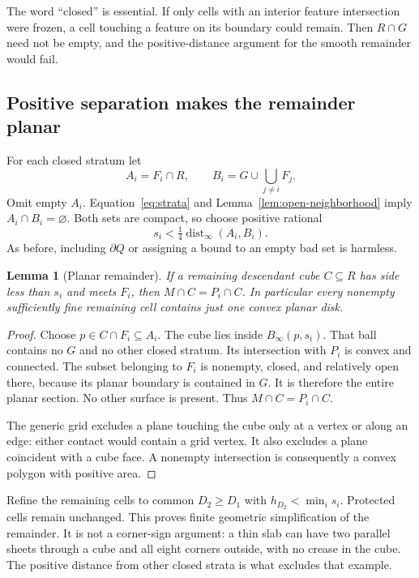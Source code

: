 \documentclass[11pt]{article}
\newtheorem{lemma}[theorem]{Lemma}
\theoremstyle{definition}
\theoremstyle{remark}
\newcommand{\dist}{\operatorname{dist}}
\newcommand{\Binf}[2]{B_\infty(#1,#2)}
\begin{document}
The word ``closed'' is essential. If only cells with an interior
feature intersection were frozen, a cell touching a feature on its
boundary could remain. Then $R\cap G$ need not be empty, and the
positive-distance argument for the smooth remainder would fail.

\subsection{Positive separation makes the remainder planar}
\label{sec:smooth}

For each closed stratum let
\[
  A_i=F_i\cap R,\qquad
  B_i=G\cup\bigcup_{j\ne i}F_j.
\]
Omit empty $A_i$. Equation~\eqref{eq:strata} and
Lemma~\ref{lem:open-neighborhood} imply $A_i\cap B_i=\varnothing$.
Both sets are compact, so choose positive rational
\[
  s_i<\tfrac14\dist_\infty(A_i,B_i). \tag{9}\label{eq:smooth-clearance}
\]
As before, including $\partial Q$ or assigning a bound to an empty
bad set is harmless.

\begin{lemma}[Planar remainder]
\label{lem:smooth}
If a remaining descendant cube $C\subseteq R$ has side less than
$s_i$ and meets $F_i$, then $M\cap C=P_i\cap C$. In particular every
nonempty sufficiently fine remaining cell contains just one convex
planar disk.
\end{lemma}

\begin{proof}
Choose $p\in C\cap F_i\subseteq A_i$. The cube lies inside
$\Binf{p}{s_i}$. That ball contains no $G$ and no other closed stratum.
Its intersection with $P_i$ is convex and connected. The subset
belonging to $F_i$ is nonempty, closed, and relatively open there,
because its planar boundary is contained in $G$. It is therefore the
entire planar section. No other surface is present. Thus
$M\cap C=P_i\cap C$.

The generic grid excludes a plane touching the cube only at a vertex
or along an edge: either contact would contain a grid vertex. It
also excludes a plane coincident with a cube face. A nonempty
intersection is consequently a convex polygon with positive area.
\end{proof}

Refine the remaining cells to common $D_2\ge D_1$ with
$h_{D_2}<\min_i s_i$. Protected cells remain unchanged. This proves
finite geometric simplification of the remainder. It is not a corner-sign
argument: a thin slab can have two parallel sheets through a cube and
all eight corners outside, with no crease in the cube. The positive
distance from other closed strata is what excludes that example.
\end{document}
